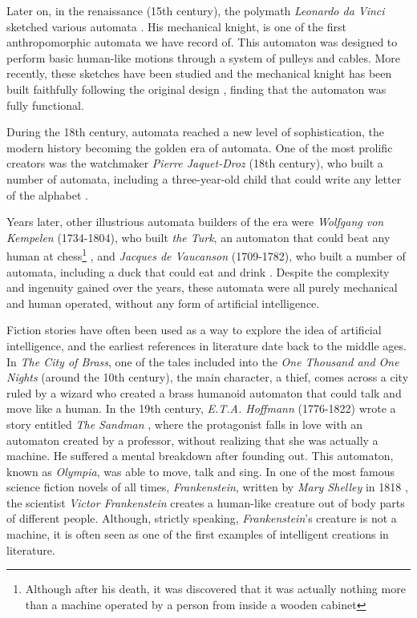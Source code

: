 Later on, in the renaissance (15th century), the polymath \textit{Leonardo da Vinci} sketched various automata \autocite{nils2009}. His mechanical knight, is one of the first anthropomorphic automata we have record of. This automaton was designed to perform basic human-like motions through a system of pulleys and cables. More recently, these sketches have been studied and the mechanical knight has been built faithfully following the original design \autocite{elling2006}, finding that the automaton was fully functional. 

During the 18th century, automata reached a new level of sophistication, the modern history becoming the golden era of automata. One of the most prolific creators was the watchmaker \textit{Pierre Jaquet-Droz} (18th century), who built a number of automata, including a three-year-old child that could write any letter of the alphabet \autocite{carrera1979}.

Years later, other illustrious automata builders of the era were \textit{Wolfgang von Kempelen} (1734-1804), who built \textit{the Turk}, an automaton that could beat any human at chess\footnote{Although after his death, it was discovered that it was actually nothing more than a machine operated by a person from inside a wooden cabinet} \autocite{jay2000}, 
and \textit{Jacques de Vaucanson} (1709-1782), who built a number of automata, including a duck that could eat and drink \autocite{nils2009, trymbaka2022}. Despite the complexity and ingenuity gained over the years, these automata were all purely mechanical and human operated, without any form of artificial intelligence. 

Fiction stories have often been used as a way to explore the idea of artificial intelligence, and the earliest references in literature date back to the middle ages. In \textit{The City of Brass}, one of the tales included into the \textit{One Thousand and One Nights} (around the 10th century), the main character, a thief, comes across a city ruled by a wizard who created a brass humanoid automaton that could talk and move like a human. In the 19th century, \textit{E.T.A. Hoffmann} (1776-1822) wrote a story entitled \textit{The Sandman} \autocite{hoffmann1816}, where the protagonist falls in love with an automaton created by a professor, without realizing that she was actually a machine. He suffered a mental breakdown after founding out. This automaton, known as \textit{Olympia}, was able to move, talk and sing. In one of the most famous science fiction novels of all times, \textit{Frankenstein}, written by \textit{Mary Shelley} in 1818 \autocite{shelley1994}, the scientist \textit{Victor Frankenstein} creates a human-like creature out of body parts of different people. Although, strictly speaking, \textit{Frankenstein}'s creature is not a machine, it is often seen as one of the first examples of intelligent creations in literature.

